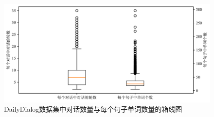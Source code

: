 \begin{figure}[htb]
	\centering
	\includegraphics[width=0.75\linewidth]{images/数据分析.pdf}
	\caption{DailyDialog数据集中对话数量与每个句子单词数量的箱线图}
	\label{fig:sentenceNum}
\end{figure}
